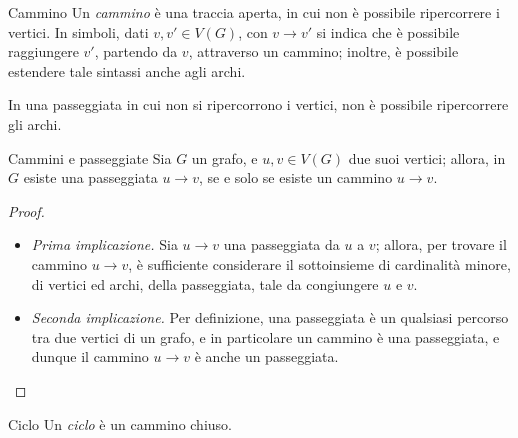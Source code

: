 \documentclass[a4paper, 12pt]{report}
\begin{document}
    \begin{frameddefn}{Cammino}
        Un \textit{cammino} è una traccia aperta, in cui non è possibile ripercorrere i vertici. In simboli, dati $v, v' \in V(G)$, con $v \rightarrow v'$ si indica che è possibile raggiungere $v'$, partendo da $v$, attraverso un cammino; inoltre, è possibile estendere tale sintassi anche agli archi.
    \end{frameddefn}

    \begin{framedobs}{}
        In una passeggiata in cui non si ripercorrono i vertici, non è possibile ripercorrere gli archi.
    \end{framedobs}

    \begin{framedthm}[label={cammini e passeggiate}]{Cammini e passeggiate}
        Sia $G$ un grafo, e $u, v \in V(G)$ due suoi vertici; allora, in $G$ esiste una passeggiata $u \rightarrow v$, se e solo se esiste un cammino $u \rightarrow v$.
    \end{framedthm}

    \begin{proof}
        \hspace{0.7cm}
        \begin{itemize}
            \item[] \textit{Prima implicazione.} Sia $u \rightarrow v$ una passeggiata da $u$ a $v$; allora, per trovare il cammino $u \rightarrow v$, è sufficiente considerare il sottoinsieme di cardinalità minore, di vertici ed archi, della passeggiata, tale da congiungere $u$ e $v$.
            \item[] \textit{Seconda implicazione.} Per definizione, una passeggiata è un qualsiasi percorso tra due vertici di un grafo, e in particolare un cammino è una passeggiata, e dunque il cammino $u \rightarrow v$ è anche un passeggiata.
        \end{itemize}
    \end{proof}

    \begin{frameddefn}{Ciclo}
        Un \textit{ciclo} è un cammino chiuso.
    \end{frameddefn}
\end{document}
